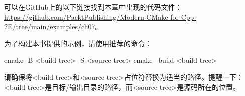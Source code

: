 

可以在GitHub上的以下链接找到本章中出现的代码文件：\url{https://github.com/PacktPublishing/Modern-CMake-for-Cpp-2E/tree/main/examples/ch07}。

为了构建本书提供的示例，请使用推荐的命令：

\begin{shell}
cmake -B <build tree> -S <source tree>
cmake --build <build tree>
\end{shell}

请确保将<build tree>和<source tree>占位符替换为适当的路径。提醒一下：<build tree>是目标/输出目录的路径，而<source tree>是源码所在的位置。














